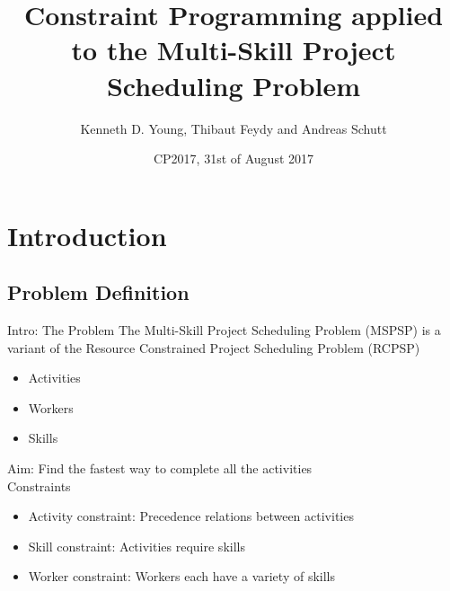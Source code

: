 \documentclass{beamer}
\title[CP applied to the MSPSP]{Constraint Programming applied to the Multi-Skill Project Scheduling Problem}
\author{Kenneth D. Young, Thibaut Feydy and Andreas Schutt}
\date{CP2017, 31st of August 2017}
\begin{document}
\maketitle

\section{Introduction}
\subsection{Problem Definition}
\begin{frame}{Intro: The Problem}
	The Multi-Skill Project Scheduling Problem (MSPSP) is a variant of the Resource Constrained Project Scheduling Problem (RCPSP)\pause
	\begin{itemize}
		\item Activities
		\item Workers
		\item Skills\pause
	\end{itemize}
	\vspace{4mm}
	\alert{Aim:} Find the fastest way to complete all the activities\pause\\
	\vspace{4mm}
	Constraints
	\begin{itemize}
		\item Activity constraint: Precedence relations between activities
		\item Skill constraint: Activities require skills
		\item Worker constraint: Workers each have a variety of skills
	\end{itemize}
\end{frame}
\end{document}
